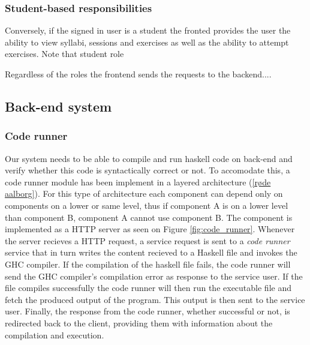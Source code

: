 \subsubsection*{Student-based responsibilities}
Conversely, if the signed in user is a student the fronted provides the user the ability to view syllabi, sessions and exercises as well as the ability to attempt exercises. Note that student role 


\vspace{5cm}

Regardless of the roles the frontend sends the requests to the backend....



\subsection{Back-end system}


\subsubsection{Code runner}
Our system needs to be able to compile and run haskell code on back-end and verify whether this code is syntactically correct or not.
To accomodate this, a code runner module has been implement in a layered architecture (\ref{røde aalborg}).
For this type of architecture each component can depend only on components on a lower or same level, thus if component A is on a lower level than component B, component A cannot use component B.
The component is implemented as a HTTP server as seen on Figure \ref{fig:code_runner}.
Whenever the server recieves a HTTP request, a service request is sent to a \textit{code runner} service that in turn writes the content recieved to a Haskell file and invokes the GHC compiler.
If the compilation of the haskell file fails, the code runner will send the GHC compiler's compilation error as response to the service user.
If the file compiles successfully the code runner will then run the executable file and fetch the produced output of the program.
This output is then sent to the service user.
Finally, the response from the code runner, whether successful or not, is redirected back to the client, providing them with information about the compilation and execution.



